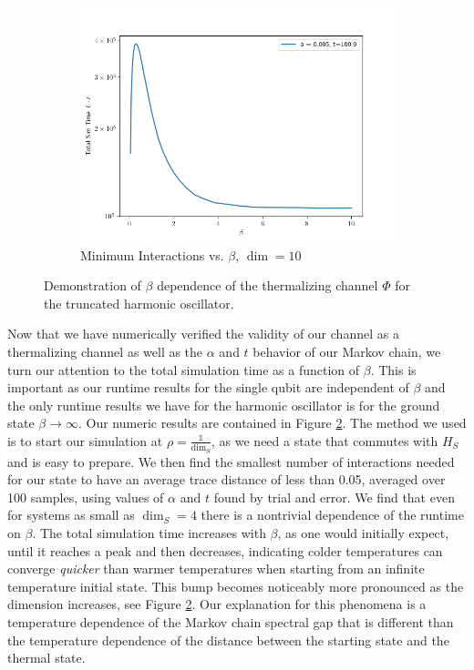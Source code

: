 \documentclass{article}
\newcommand{\identity}{\mathds{1}}
\begin{document}
\begin{figure}[t]
\begin{subfigure}{0.5\textwidth}
    \includegraphics[width=\textwidth]{numerics/data/sho_big_peak.png}
    \caption{Minimum Interactions vs. $\beta$, $\dim = 10$}
    \label{fig:sho_l_vs_beta_dim_10}
    \end{subfigure}
    \caption{Demonstration of $\beta$ dependence of the thermalizing channel $\Phi$ for the truncated harmonic oscillator.}
    \label{fig:sho_total_time_vs_beta}
\end{figure}


Now that we have numerically verified the validity of our channel as a thermalizing channel as well as the $\alpha$ and $t$ behavior of our Markov chain, we turn our attention to the total simulation time as a function of $\beta$. This is important as our runtime results for the single qubit are independent of $\beta$ and the only runtime results we have for the harmonic oscillator is for the ground state $\beta \to \infty$. Our numeric results are contained in Figure \ref{fig:sho_total_time_vs_beta}. The method we used is to start our simulation at $\rho = \frac{\identity}{\dim_S}$, as we need a state that commutes with $H_S$ and is easy to prepare. We then find the smallest number of interactions needed for our state to have an average trace distance of less than 0.05, averaged over 100 samples, using values of $\alpha$ and $t$ found by trial and error. We find that even for systems as small as $\dim_S = 4$ there is a nontrivial dependence of the runtime on $\beta$. The total simulation time increases with $\beta$, as one would initially expect, until it reaches a peak and then decreases, indicating colder temperatures can converge \emph{quicker} than warmer temperatures when starting from an infinite temperature initial state. This bump becomes noticeably more pronounced as the dimension increases, see Figure \ref{fig:sho_total_time_vs_beta}. Our explanation for this phenomena is a temperature dependence of the Markov chain spectral gap that is different than the temperature dependence of the distance between the starting state and the thermal state. 
\end{document}
